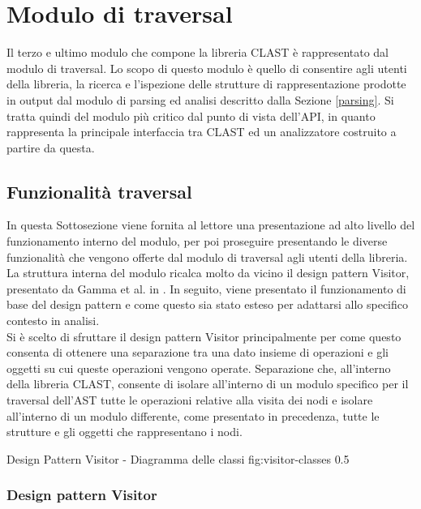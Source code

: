 \section{Modulo di traversal}

Il terzo e ultimo modulo che compone la libreria CLAST è rappresentato dal
modulo di traversal. Lo scopo di questo modulo è quello di consentire agli
utenti della libreria, la ricerca e l'ispezione delle strutture di
rappresentazione prodotte in output dal modulo di parsing ed analisi descritto
dalla Sezione \ref{parsing}. Si tratta quindi del modulo più critico dal punto
di vista dell'API, in quanto rappresenta la principale interfaccia tra CLAST ed
un analizzatore costruito a partire da questa.

\subsection{Funzionalità traversal}

In questa Sottosezione viene fornita al lettore una presentazione ad alto livello
del funzionamento interno del modulo, per poi proseguire presentando le
diverse funzionalità che vengono offerte dal modulo di traversal agli utenti
della libreria.\\

La struttura interna del modulo ricalca molto da vicino il design pattern
Visitor, presentato da Gamma et al. in \cite{gamma1995design}. In seguito, viene
presentato il funzionamento di base del design pattern e come questo sia stato
esteso per adattarsi allo specifico contesto in analisi.\\

Si è scelto di sfruttare il design pattern Visitor principalmente per come
questo consenta di ottenere una separazione tra una dato insieme di operazioni
e gli oggetti su cui queste operazioni vengono operate. Separazione che,
all'interno della libreria CLAST, consente di isolare all'interno di un modulo
specifico per il traversal dell'AST tutte le operazioni relative alla visita
dei nodi e isolare all'interno di un modulo differente, come presentato in
precedenza, tutte le strutture e gli oggetti che rappresentano i nodi.

      {Design Pattern Visitor - Diagramma delle classi}
      {fig:visitor-classes}
      {0.5}

\subsubsection{Design pattern Visitor}

